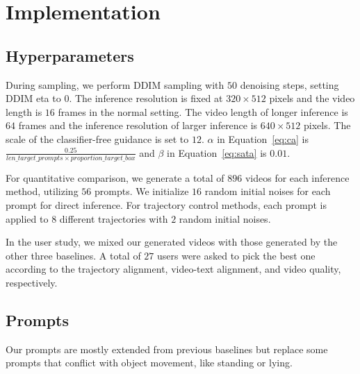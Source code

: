 \section{Implementation}

\subsection{Hyperparameters}

During sampling, we perform DDIM sampling \citep{ddim} with $50$ denoising steps, setting DDIM eta to 0. The inference resolution is fixed at $320\times512$ pixels and the video length is $16$ frames in the normal setting. The video length of longer inference is $64$ frames and the inference resolution of larger inference is $640\times512$ pixels. The scale of the classifier-free guidance is set to $12$. $\alpha$ in Equation~\ref{eq:ca} is $\frac{0.25}{len\_target\_prompts \times proportion\_target\_box}$ and $\beta$ in Equation~\ref{eq:sata} is $0.01$.
%

For quantitative comparison, we generate a total of $896$ videos for each inference method, utilizing $56$ prompts. We initialize $16$ random initial noises for each prompt for direct inference. For trajectory control methods, each prompt is applied to $8$ different trajectories with $2$ random initial noises. 

In the user study, we mixed our generated videos with those generated by the other three baselines. A total of $27$ users were asked to pick the best one according to the trajectory alignment, video-text alignment, and video quality, respectively.



\subsection{Prompts}

Our prompts are mostly extended from previous baselines\citep{jain2023peekaboo, ma2023trailblazer} but replace some prompts that conflict with object movement, like standing or lying.

